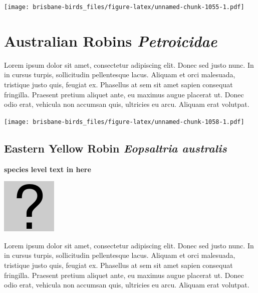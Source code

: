 \documentclass[]{book}
\let\origfigure\figure
\let\endorigfigure\endfigure
\renewenvironment{figure}[1][2] {
  \expandafter\origfigure\expandafter[H]
} {
  \endorigfigure
}
\begin{document}
\begin{figure}
\centering
\texttt{[image: brisbane-birds\_files/figure-latex/unnamed-chunk-1055-1.pdf]}
\caption{\label{fig:unnamed-chunk-1055}insert figure caption}
\end{figure}

\chapter{\texorpdfstring{Australian Robins
\emph{Petroicidae}}{Australian Robins Petroicidae}}\label{australian-robins-petroicidae}

Lorem ipsum dolor sit amet, consectetur adipiscing elit. Donec sed justo
nunc. In in cursus turpis, sollicitudin pellentesque lacus. Aliquam et
orci malesuada, tristique justo quis, feugiat ex. Phasellus at sem sit
amet sapien consequat fringilla. Praesent pretium aliquet ante, eu
maximus augue placerat ut. Donec odio erat, vehicula non accumsan quis,
ultricies eu arcu. Aliquam erat volutpat.

\texttt{[image: brisbane-birds\_files/figure-latex/unnamed-chunk-1058-1.pdf]}

\section{\texorpdfstring{Eastern Yellow Robin \emph{Eopsaltria
australis}}{Eastern Yellow Robin Eopsaltria australis}}\label{eastern-yellow-robin-eopsaltria-australis}

\textbf{species level text in here}

\begin{figure}
\centering
\includegraphics{assets/missing.png}
\caption{No image for species}
\end{figure}

Lorem ipsum dolor sit amet, consectetur adipiscing elit. Donec sed justo
nunc. In in cursus turpis, sollicitudin pellentesque lacus. Aliquam et
orci malesuada, tristique justo quis, feugiat ex. Phasellus at sem sit
amet sapien consequat fringilla. Praesent pretium aliquet ante, eu
maximus augue placerat ut. Donec odio erat, vehicula non accumsan quis,
ultricies eu arcu. Aliquam erat volutpat.
\end{document}

